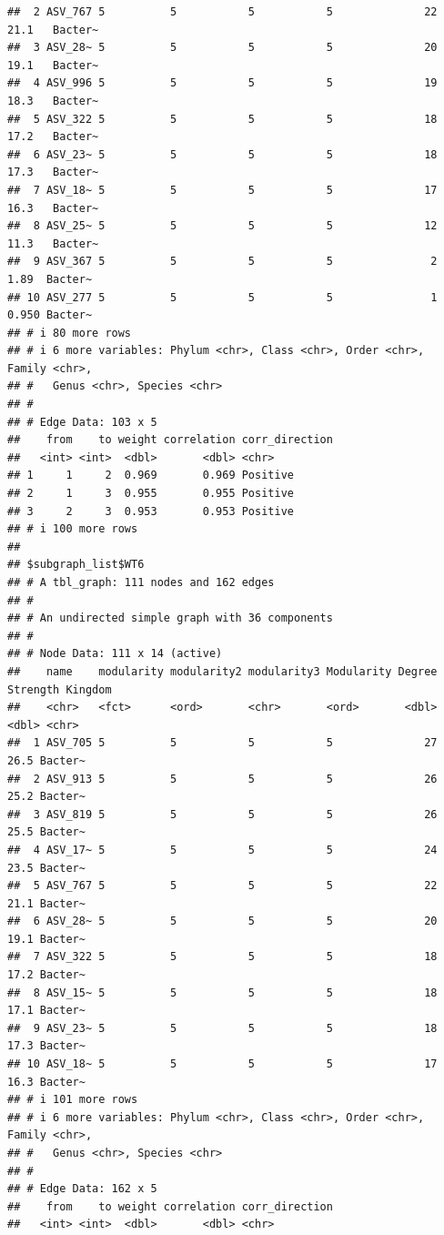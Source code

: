 \documentclass[
]{book}
\begin{document}
\begin{verbatim}
##  2 ASV_767 5          5           5           5              22   21.1   Bacter~
##  3 ASV_28~ 5          5           5           5              20   19.1   Bacter~
##  4 ASV_996 5          5           5           5              19   18.3   Bacter~
##  5 ASV_322 5          5           5           5              18   17.2   Bacter~
##  6 ASV_23~ 5          5           5           5              18   17.3   Bacter~
##  7 ASV_18~ 5          5           5           5              17   16.3   Bacter~
##  8 ASV_25~ 5          5           5           5              12   11.3   Bacter~
##  9 ASV_367 5          5           5           5               2    1.89  Bacter~
## 10 ASV_277 5          5           5           5               1    0.950 Bacter~
## # i 80 more rows
## # i 6 more variables: Phylum <chr>, Class <chr>, Order <chr>, Family <chr>,
## #   Genus <chr>, Species <chr>
## #
## # Edge Data: 103 x 5
##    from    to weight correlation corr_direction
##   <int> <int>  <dbl>       <dbl> <chr>         
## 1     1     2  0.969       0.969 Positive      
## 2     1     3  0.955       0.955 Positive      
## 3     2     3  0.953       0.953 Positive      
## # i 100 more rows
## 
## $subgraph_list$WT6
## # A tbl_graph: 111 nodes and 162 edges
## #
## # An undirected simple graph with 36 components
## #
## # Node Data: 111 x 14 (active)
##    name    modularity modularity2 modularity3 Modularity Degree Strength Kingdom
##    <chr>   <fct>      <ord>       <chr>       <ord>       <dbl>    <dbl> <chr>  
##  1 ASV_705 5          5           5           5              27     26.5 Bacter~
##  2 ASV_913 5          5           5           5              26     25.2 Bacter~
##  3 ASV_819 5          5           5           5              26     25.5 Bacter~
##  4 ASV_17~ 5          5           5           5              24     23.5 Bacter~
##  5 ASV_767 5          5           5           5              22     21.1 Bacter~
##  6 ASV_28~ 5          5           5           5              20     19.1 Bacter~
##  7 ASV_322 5          5           5           5              18     17.2 Bacter~
##  8 ASV_15~ 5          5           5           5              18     17.1 Bacter~
##  9 ASV_23~ 5          5           5           5              18     17.3 Bacter~
## 10 ASV_18~ 5          5           5           5              17     16.3 Bacter~
## # i 101 more rows
## # i 6 more variables: Phylum <chr>, Class <chr>, Order <chr>, Family <chr>,
## #   Genus <chr>, Species <chr>
## #
## # Edge Data: 162 x 5
##    from    to weight correlation corr_direction
##   <int> <int>  <dbl>       <dbl> <chr>         

\end{verbatim}
\end{document}
